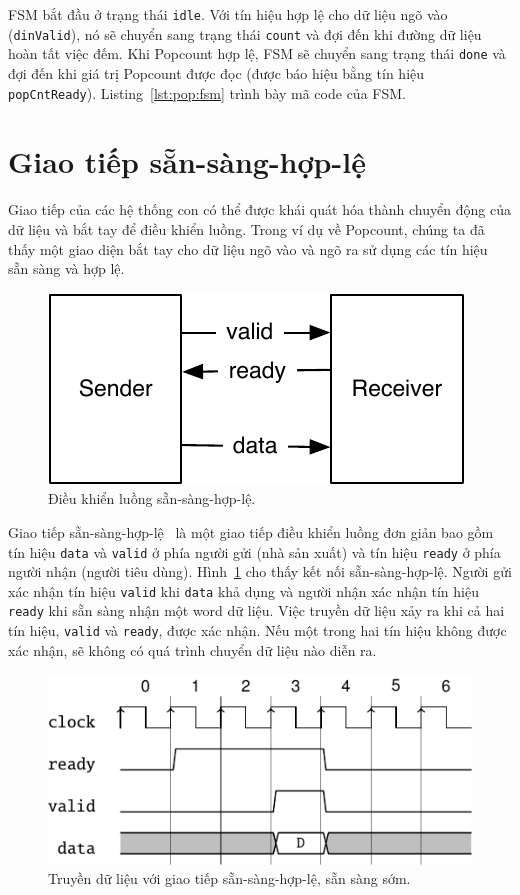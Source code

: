 \documentclass[%
    10pt,
    headinclude, footexclude,
    openright, %
    notitlepage,
    cleardoubleempty,
    headsepline,
    pointlessnumbers,
    bibtotoc, idxtotoc,
    ]{scrbook}
\newcommand{\code}[1]{{\small{\texttt{#1}}}}
\newcommand{\scale}{0.7}
\begin{document}
FSM bắt đầu ở trạng thái \code{idle}. Với tín hiệu hợp lệ cho dữ liệu ngõ vào (\code{dinValid}), nó sẽ chuyển sang trạng thái \code{count} và đợi đến khi đường dữ liệu hoàn tất việc đếm. Khi Popcount hợp lệ, FSM sẽ chuyển sang trạng thái \code{done} và đợi đến khi giá trị Popcount được đọc (được báo hiệu bằng tín hiệu \code{popCntReady}). Listing~\ref{lst:pop:fsm} trình bày mã code của FSM. 

\section{Giao tiếp sẵn-sàng-hợp-lệ}

Giao tiếp của các hệ thống con có thể được khái quát hóa thành chuyển động của dữ liệu và bắt tay để điều khiển luồng. Trong ví dụ về Popcount, chúng ta đã thấy một giao diện bắt tay cho dữ liệu ngõ vào và ngõ ra sử dụng các tín hiệu sẵn sàng và hợp lệ. 

\begin{figure}
  \centering
  \includegraphics[scale=\scale]{figures/readyvalid}
  \caption{Điều khiển luồng sẵn-sàng-hợp-lệ.}
  \label{fig:readyvalid}
\end{figure}

Giao tiếp sẵn-sàng-hợp-lệ~\cite[p.~480]{dally:vhdl:2016} là một giao tiếp điều khiển luồng đơn giản bao gồm tín hiệu \code{data} và \code{valid} ở phía người gửi (nhà sản xuất) và tín hiệu \code{ready} ở phía người nhận (người tiêu dùng). Hình~\ref{fig:readyvalid} cho thấy kết nối sẵn-sàng-hợp-lệ. Người gửi xác nhận tín hiệu \code{valid} khi \code{data} khả dụng và người nhận xác nhận tín hiệu \code{ready} khi sẵn sàng nhận một word dữ liệu. Việc truyền dữ liệu xảy ra khi cả hai tín hiệu, \code{valid} và \code{ready}, được xác nhận. Nếu một trong hai tín hiệu không được xác nhận, sẽ không có quá trình chuyển dữ liệu nào diễn ra. 

\begin{figure}
  \centering
  \includegraphics[scale=1]{figures/ready_valid1}
  \caption{Truyền dữ liệu với giao tiếp sẵn-sàng-hợp-lệ, sẵn sàng sớm.}
  \label{fig:ready_valid1}
\end{figure}
\end{document}
